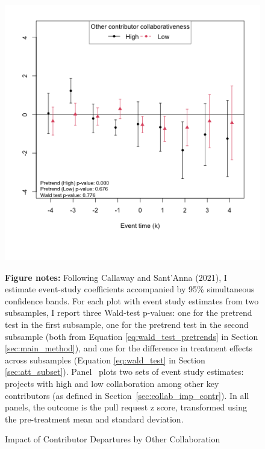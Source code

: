 \begin{figure}[htbp]
    \caption{Impact of Contributor Departures by Other Collaboration}
    \label{fig:prs_opened_other_fig}
    \centering
    \begin{minipage}[b]{0.48\textwidth}
        \centering
         \label{fig:prs_opened_other}
        \includegraphics[width=\textwidth]{temp/output/collab/prs_opened_other_collab_cs_norm.png}
    \end{minipage}
  \begin{minipage}{\textwidth}
    \textbf{Figure notes:} 
    Following Callaway and Sant’Anna (2021), I estimate event-study coefficients accompanied by 95\% simultaneous confidence bands. For each plot with event study estimates from two subsamples, I report three Wald-test p-values: one for the pretrend test in the first subsample, one for the pretrend test in the second subsample (both from Equation \ref{eq:wald_test_pretrends} in Section \ref{sec:main_method}), and one for the difference in treatment effects across subsamples (Equation \ref{eq:wald_test} in Section \ref{sec:att_subset}). 
    Panel~ plots two sets of event study estimates: projects with high and low collaboration among other key contributors (as defined in Section~\ref{sec:collab_imp_contr}). In all panels, the outcome is the pull request z score, transformed using the pre-treatment mean and standard deviation.

  \end{minipage}
\end{figure}
